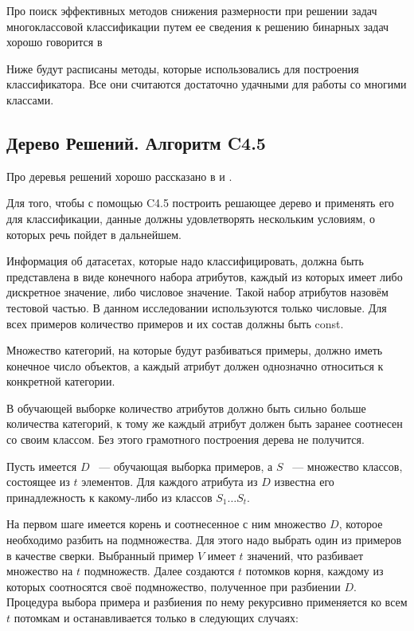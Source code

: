 Про поиск эффективных методов снижения размерности при решении задач многоклассовой классификации путем ее сведения к решению бинарных задач хорошо говорится в \cite{many-binary}

Ниже будут расписаны методы, которые использовались для построения классификатора. 
Все они считаются достаточно удачными для работы со многими классами.

\subsection{Дерево Решений. Алгоритм C4.5}

Про деревья решений хорошо рассказано в \cite{tree-rus} и \cite{tree-eng}.

Для того, чтобы с помощью C4.5 построить решающее дерево и применять его для классификации, данные должны удовлетворять нескольким условиям, о которых речь пойдет в дальнейшем.

Информация об датасетах, которые надо классифицировать, должна быть представлена в виде конечного набора атрибутов, каждый из которых имеет либо дискретное значение, либо числовое значение.
Такой набор атрибутов назовём тестовой частью. 
В данном исследовании используются только числовые.
Для всех примеров количество примеров и их состав должны быть const.

Множество категорий, на которые будут разбиваться примеры, должно иметь конечное число объектов, а каждый атрибут должен однозначно относиться к конкретной категории.

В обучающей выборке количество атрибутов должно быть сильно больше количества категорий, к тому же каждый атрибут должен быть заранее соотнесен со своим классом.
Без этого грамотного построения дерева не получится.

Пусть имеется $D$ ~--- обучающая выборка примеров, а $S$ ~--- множество классов, состоящее из $t$ элементов. Для каждого атрибута из $D$ известна его принадлежность к какому-либо из классов $S_1 \ldots S_t$.

На первом шаге имеется корень и соотнесенное с ним множество $D$, которое необходимо разбить на подмножества. Для этого надо выбрать один из примеров в качестве сверки. Выбранный пример $V$ имеет $t$ значений, что разбивает множество на $t$ подмножеств. Далее создаются $t$ потомков корня, каждому из которых соотносятся своё подмножество, полученное при разбиении $D$. Процедура выбора примера и разбиения по нему рекурсивно применяется ко всем $t$ потомкам и останавливается только в следующих случаях:

